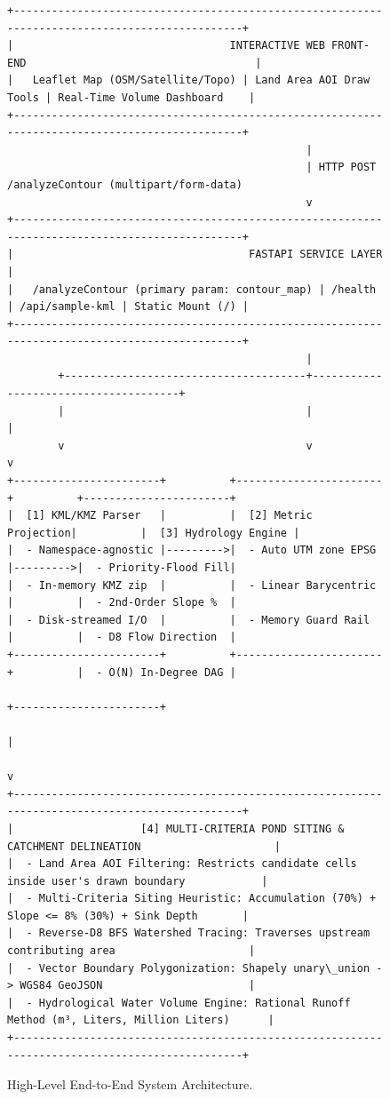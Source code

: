 \documentclass[manuscript,screen,review]{acmart}
\begin{document}
\begin{figure}[h]
  \centering
  \begin{verbatim}
+-----------------------------------------------------------------------------------------------+
|                                  INTERACTIVE WEB FRONT-END                                    |
|   Leaflet Map (OSM/Satellite/Topo) | Land Area AOI Draw Tools | Real-Time Volume Dashboard    |
+-----------------------------------------------------------------------------------------------+
                                               |
                                               | HTTP POST /analyzeContour (multipart/form-data)
                                               v
+-----------------------------------------------------------------------------------------------+
|                                     FASTAPI SERVICE LAYER                                     |
|   /analyzeContour (primary param: contour_map) | /health | /api/sample-kml | Static Mount (/) |
+-----------------------------------------------------------------------------------------------+
                                               |
        +--------------------------------------+--------------------------------------+
        |                                      |                                      |
        v                                      v                                      v
+-----------------------+          +-----------------------+          +-----------------------+
|  [1] KML/KMZ Parser   |          |  [2] Metric Projection|          |  [3] Hydrology Engine |
|  - Namespace-agnostic |--------->|  - Auto UTM zone EPSG |--------->|  - Priority-Flood Fill|
|  - In-memory KMZ zip  |          |  - Linear Barycentric |          |  - 2nd-Order Slope %  |
|  - Disk-streamed I/O  |          |  - Memory Guard Rail  |          |  - D8 Flow Direction  |
+-----------------------+          +-----------------------+          |  - O(N) In-Degree DAG |
                                                                      +-----------------------+
                                                                                  |
                                                                                  v
+-----------------------------------------------------------------------------------------------+
|                    [4] MULTI-CRITERIA POND SITING & CATCHMENT DELINEATION                     |
|  - Land Area AOI Filtering: Restricts candidate cells inside user's drawn boundary            |
|  - Multi-Criteria Siting Heuristic: Accumulation (70%) + Slope <= 8% (30%) + Sink Depth       |
|  - Reverse-D8 BFS Watershed Tracing: Traverses upstream contributing area                     |
|  - Vector Boundary Polygonization: Shapely unary\_union -> WGS84 GeoJSON                       |
|  - Hydrological Water Volume Engine: Rational Runoff Method (m³, Liters, Million Liters)      |
+-----------------------------------------------------------------------------------------------+
  \end{verbatim}
  \caption{High-Level End-to-End System Architecture.}
  \label{fig:architecture}
\end{figure}
\end{document}
